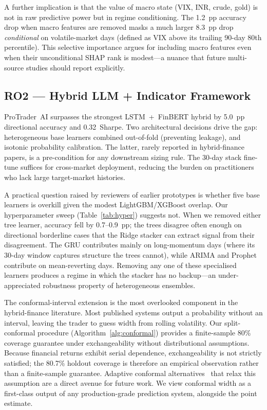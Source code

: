 A further implication is that the value of macro state (VIX, INR, crude,
gold) is not in raw predictive power but in regime conditioning. The 1.2~pp
accuracy drop when macro features are removed masks a much larger 8.3~pp
drop \emph{conditional} on volatile-market days (defined as VIX above its
trailing 90-day 80th percentile). This selective importance argues for
including macro features even when their unconditional SHAP rank is modest---a
nuance that future multi-source studies should report explicitly.

\subsection{RO2 --- Hybrid LLM + Indicator Framework}

ProTrader~AI surpasses the strongest LSTM~+~FinBERT hybrid by 5.0~pp
directional accuracy and 0.32~Sharpe. Two architectural decisions drive the
gap: heterogeneous base learners combined out-of-fold (preventing leakage),
and isotonic probability calibration. The latter, rarely reported in
hybrid-finance papers, is a pre-condition for any downstream sizing rule.
The 30-day stack fine-tune suffices for cross-market deployment, reducing
the burden on practitioners who lack large target-market histories.

A practical question raised by reviewers of earlier prototypes is whether
five base learners is overkill given the modest LightGBM/XGBoost overlap.
Our hyperparameter sweep (Table~\ref{tab:hyper}) suggests not. When we
removed either tree learner, accuracy fell by 0.7--0.9~pp; the trees
disagree often enough on directional borderline cases that the Ridge
stacker can extract signal from their disagreement. The GRU contributes
mainly on long-momentum days (where its 30-day window captures structure
the trees cannot), while ARIMA and Prophet contribute on mean-reverting
days. Removing any one of these specialised learners produces a regime in
which the stacker has no backup---an under-appreciated robustness property
of heterogeneous ensembles.

The conformal-interval extension is the most overlooked component in the
hybrid-finance literature. Most published systems output a probability
without an interval, leaving the trader to guess width from rolling
volatility. Our split-conformal procedure (Algorithm~\ref{alg:conformal})
provides a finite-sample 80\% coverage guarantee under exchangeability
without distributional assumptions. Because financial returns exhibit serial
dependence, exchangeability is not strictly satisfied; the 80.7\% holdout
coverage is therefore an empirical observation rather than a finite-sample
guarantee. Adaptive conformal alternatives~\cite{gibbs2021adaptive} that
relax this assumption are a direct avenue for future work. We view conformal width as a first-class output of
any production-grade prediction system, alongside the point estimate.

